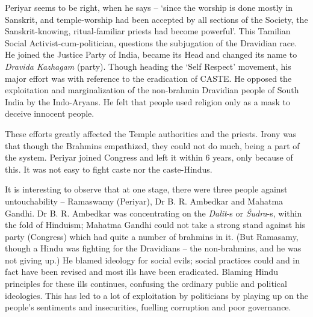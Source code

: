Periyar seems to be right, when he says – ‘since the worship is done mostly in Sanskrit, and temple-worship had been accepted by all sections of the Society, the Sanskrit-knowing, ritual-familiar priests had become powerful'. This Tamilian Social Activist-cum-politician, questions the subjugation of the Dravidian race. He joined the Justice Party of India, became its Head and changed its name to \textit{Dravida Kazhagam} (party). Though heading the ‘Self Respect’ movement, his major effort was with reference to the eradication of CASTE. He opposed the exploitation and marginalization of the non-brahmin Dravidian people of South India by the Indo-Aryans. He felt that people used religion only as a mask to deceive innocent people.

These efforts greatly affected the Temple authorities and the priests. Irony was that though the Brahmins empathized, they could not do much, being a part of the system. Periyar joined Congress and left it within 6 years, only because of this. It was not easy to fight caste nor the caste-Hindus.

It is interesting to observe that at one stage, there were three people against untouchability – Ramaswamy (Periyar), Dr B. R. Ambedkar and Mahatma Gandhi. Dr B. R. Ambedkar was concentrating on the \textit{Dalit}-s or \textit{Śudra}-s, within the fold of Hinduism; Mahatma Gandhi could not take a strong stand against his party (Congress) which had quite a number of brahmins in it. (But Ramasamy, though a Hindu was fighting for the Dravidians – the non-brahmins, and he was not giving up.) He blamed ideology for social evils; social practices could and in fact have been revised and most ills have been eradicated. Blaming Hindu principles for these ills continues, confusing the ordinary public and political ideologies. This has led to a lot of exploitation by politicians by playing up on the people’s sentiments and insecurities, fuelling corruption and poor governance.

